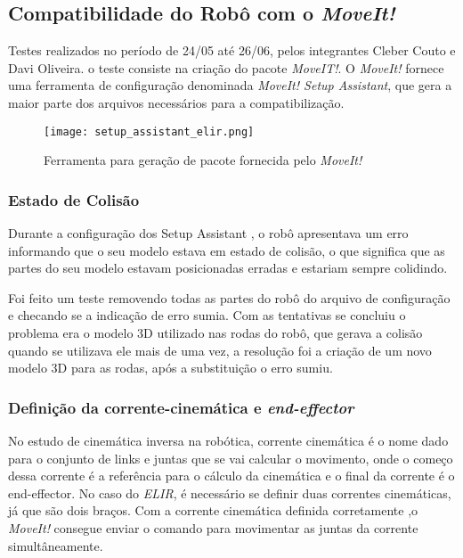 \subsection{Compatibilidade do Robô com o \textit{MoveIt!}}
Testes realizados no período de 24/05 até 26/06, pelos integrantes Cleber Couto e Davi Oliveira. o teste consiste na criação do pacote \textit{MoveIT!}. O \textit{MoveIt!} fornece uma ferramenta de configuração denominada \textit{MoveIt! Setup Assistant}, que gera a maior parte dos arquivos necessários para a compatibilização. 
\begin{figure}[h!]												
	\centering												
	\texttt{[image: setup\_assistant\_elir.png]}				
	\caption{Ferramenta para geração de pacote fornecida pelo \textit{MoveIt!}}		
	\label{img:setup_assistant}
\end{figure}

\subsubsection{Estado de Colisão}
Durante a configuração dos Setup Assistant , o robô apresentava um erro informando que o seu modelo estava em estado de colisão, o que significa que as partes do seu modelo estavam posicionadas erradas e estariam sempre colidindo.

Foi feito um teste removendo todas as partes do robô do arquivo de configuração e checando se a indicação de erro sumia. Com as tentativas se concluiu o problema era o modelo 3D utilizado nas rodas do robô, que gerava a colisão quando se utilizava ele mais de uma vez, a resolução foi a criação de um novo modelo 3D para as rodas, após a substituição o erro sumiu.

\subsubsection{Definição da corrente-cinemática e \textit{end-effector}}
No estudo de cinemática inversa na robótica, corrente cinemática é o nome dado para o conjunto de links e juntas que se vai calcular o movimento, onde o começo dessa corrente é a referência para o cálculo da cinemática e o final da corrente é o end-effector.  No caso do \textit{ELIR}, é necessário se definir duas correntes cinemáticas, já que são dois braços. Com a corrente cinemática definida corretamente ,o \textit{MoveIt!} consegue enviar o comando para movimentar as juntas da corrente simultâneamente.

